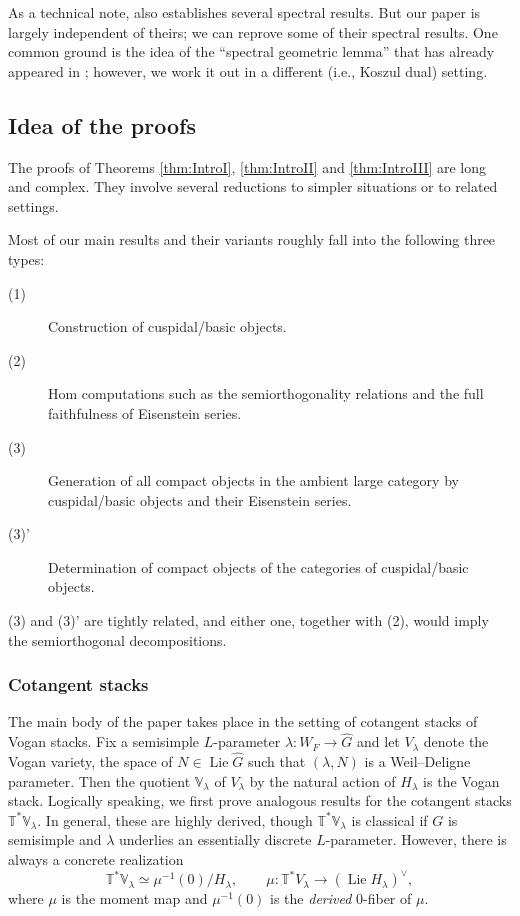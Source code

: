\documentclass{amsart}
\theoremstyle{definition}
\theoremstyle{remark}
\numberwithin{equation}{section}
\DeclareMathOperator{\Lie}{Lie}
\newcommand{\wh}{\widehat}
\newcommand{\V}{\mathbb{V}}
\newcommand{\T}{\mathbb{T}}
\begin{document}
As a technical note, \cite{HansenMann} also establishes several spectral results. But our paper is largely independent of theirs; we can reprove some of their spectral results. One common ground is the idea of the ``spectral geometric lemma'' that has already appeared in \cite{GLCIII}; however, we work it out in a different (i.e., Koszul dual) setting. 

\subsection{Idea of the proofs}
The proofs of Theorems \ref{thm:IntroI}, \ref{thm:IntroII} and \ref{thm:IntroIII} are long and complex. They involve several reductions to simpler situations or to related settings. 

Most of our main results and their variants roughly fall into the following three types:
\begin{description}
    \item[(1)] Construction of cuspidal/basic objects.
    \item[(2)] Hom computations such as the semiorthogonality relations and the full faithfulness of Eisenstein series. 
    \item[(3)] Generation of all compact objects in the ambient large category by cuspidal/basic objects and their Eisenstein series.
    \item[(3)'] Determination of compact objects of the categories of cuspidal/basic objects. 
\end{description}
(3) and (3)' are tightly related, and either one, together with (2), would imply the semiorthogonal decompositions. 

\subsubsection{Cotangent stacks}
The main body of the paper takes place in the setting of cotangent stacks of Vogan stacks. Fix a semisimple $L$-parameter $\lambda\colon W_F\to \wh G$ and let $V_\lambda$ denote the Vogan variety, the space of $N\in \Lie \wh G$ such that $(\lambda, N)$ is a Weil--Deligne parameter. Then the quotient $\V_\lambda$ of $V_\lambda$ by the natural action of $H_\lambda$ is the Vogan stack. 
Logically speaking, we first prove analogous results for the cotangent stacks $\T^*\V_\lambda$. In general, these are highly derived, though $\T^{\ast}\V_{\lambda}$ is classical if $G$ is semisimple and $\lambda$ underlies an essentially discrete $L$-parameter. However, there is always a concrete realization
\[
\T^*\V_\lambda\simeq\mu^{-1}(0)/H_\lambda, \qquad\mu\colon \T^*V_\lambda\to  (\Lie H_\lambda)^{\vee},
\]
where $\mu$ is the moment map and $\mu^{-1}(0)$ is the \emph{derived} $0$-fiber of $\mu$.
\end{document}
